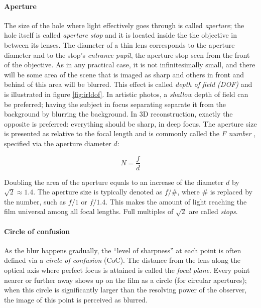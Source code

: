 
\paragraph{Aperture}
The size of the hole where light effectively goes through is called \emph{aperture}; the hole itself is called \emph{aperture stop} and it is located inside the the objective in between its lenses.
The diameter of a thin lens corresponds to the aperture diameter and to the stop's \emph{entrance pupil}, the aperture stop seen from the front of the objective.
As in any practical case, it is not infinitesimally small, and there will be some area of the scene that is imaged as sharp and others in front and behind of this area will be blurred.
This effect is called \emph{depth of field (DOF)} and is illustrated in figure \ref{fig:irldof}.
In artistic photos, a \emph{shallow} depth of field can be preferred; having the subject in focus separating separate it from the background by blurring the background.
In 3D reconstruction, exactly the opposite is preferred: everything should be sharp, in deep focus.
The aperture size is presented as relative to the focal length and is commonly called the \emph{F number} \cite{szeliski10vision}, specified via the aperture diameter $d$:

\begin{equation} \label{eq:fnumber}
	N = \frac{f}{d}
\end{equation}



Doubling the area of the aperture equals to an increase of the diameter $d$ by $\sqrt 2 \approx 1.4$.
The aperture size is typically denoted as $f/\#$, where $\#$ is replaced by the number, such as $f/1$ or $f/1.4$.
This makes the amount of light reaching the film universal among all focal lengths.
Full multiples of $\sqrt 2$ are called \emph{stops}.
\cite{szeliski10vision}

\paragraph{Circle of confusion}
As the blur happens gradually, the ``level of sharpness'' at each point is often defined via a \emph{circle of confusion} (CoC).
The distance from the lens along the optical axis where perfect focus is attained is called the \emph{focal plane}.
Every point nearer or further away shows up on the film as a circle (for circular apertures); when this circle is significantly larger than the resolving power of the observer, the image of this point is perceived as blurred.

